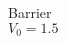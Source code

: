 \documentclass[preview]{standalone}
\begin{document}
\begin{center}
Barrier\\$V_0 = 1.5$
\end{center}
\end{document}
